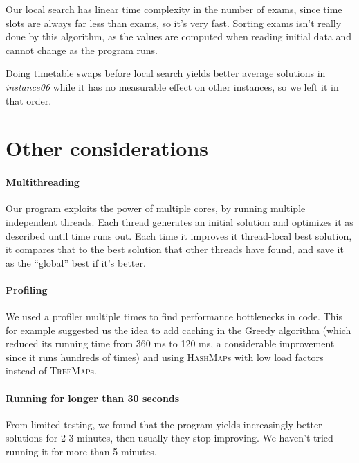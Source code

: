 \documentclass[11pt, a4paper, leqno]{article}
\begin{document}
	Our local search has linear time complexity in the number of exams, since time slots are always far less than exams, so it's very fast. Sorting exams isn't really done by this algorithm, as the values are computed when reading initial data and cannot change as the program runs.
	
	Doing timetable swaps before local search yields better average solutions in \textit{instance06} while it has no measurable effect on other instances, so we left it in that order.
	
	\section{Other considerations}
	
	\paragraph{Multithreading}
	
	Our program exploits the power of multiple cores, by running multiple independent threads. Each thread generates an initial solution and optimizes it as described until time runs out. Each time it improves it thread-local best solution, it compares that to the best solution that other threads have found, and save it as the ``global'' best if it's better.
	
	\paragraph{Profiling}
	
	We used a profiler multiple times to find performance bottlenecks in code. This for example suggested us the idea to add caching in the Greedy algorithm (which reduced its running time from 360 ms to 120 ms, a considerable improvement since it runs hundreds of times) and using \textsc{HashMap}s with low load factors instead of \textsc{TreeMap}s.
	
	\paragraph{Running for longer than 30 seconds}
	
	From limited testing, we found that the program yields increasingly better solutions for 2-3 minutes, then usually they stop improving. We haven't tried running  it for more than 5 minutes.
	
\end{document}
